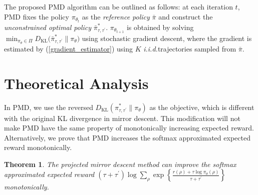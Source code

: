 \documentclass{article}
\newcommand*{\refPi}{\bar{\pi}}
\newcommand{\KL}{D_{\text{KL}}}
\newcommand{\pithetat}{\pi_{\theta_t}}
\newtheorem{thm}{Theorem}
\begin{document}
The proposed PMD algorithm can be outlined as follows: at each iteration $t$, PMD fixes the policy $\pithetat$ as the \emph{reference policy} $\refPi$ and construct the \emph{unconstrained optimal policy} $\bar{\pi}_{\tau, \tau^{\prime}}^*$. $\pi_{\theta_{t+1}}$ is obtained by solving $\min_{\pi_\theta \in \Pi}{\KL(\bar{\pi}_{\tau,\tau^{\prime}}^* \| \pi_\theta})$ using stochastic gradient descent, where the gradient is estimated by (\ref{gradient_estimator}) using $K$ \emph{i.i.d.}trajectories sampled from $\refPi$.

\section{Theoretical Analysis}

In PMD, we use the reversed $\KL(\pi_{\tau,\tau^{\prime}}^* \| \pi_\theta)$ as the objective, which is different with the original KL divergence in mirror descent. This modification will not make PMD have the same property of monotonically increasing expected reward. Alternatively, we prove that PMD increases the softmax approximated expected reward monotonically.
\begin{thm}
\label{monotonically_increasing_sr_property}
The projected mirror descent method can improve the softmax approximated expected reward $(\tau + \tau^{\prime})\log{ \sum\limits_{\rho}{ \exp\left\{ \frac{r(\rho) + \tau \log{\pi_\theta(\rho)} }{\tau + \tau^{\prime}} \right\} }}$ monotonically.
\end{thm}
\end{document}
